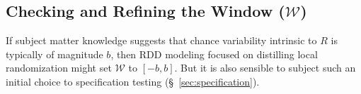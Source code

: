 



\subsection{Checking and Refining the Window ($\mathcal{W}$)}
\label{sec:bandwidthChoice}

If subject matter knowledge suggests that chance variability intrinsic
to $R$ is typically of magnitude $b$, then RDD modeling focused on
distilling local randomization might set $\mathcal{W}$ to $[-b,b]$. But it
is also sensible to subject such an initial choice to specification
testing (\S~\ref{sec:specification}).%

